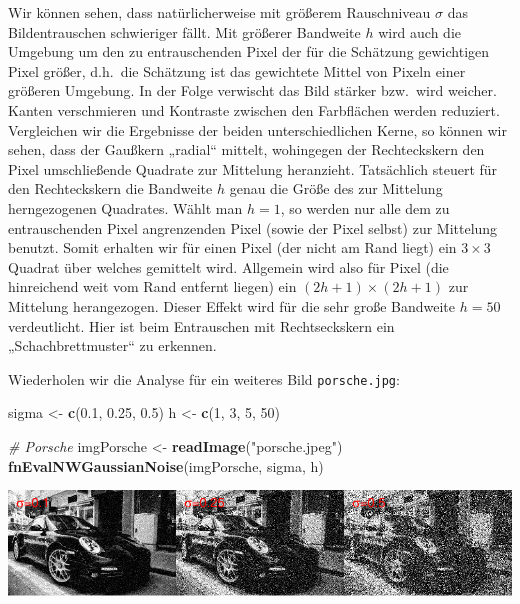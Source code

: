 \documentclass[10pt,]{article}
\newenvironment{Shaded}{\begin{snugshade}}{\end{snugshade}}
\newcommand{\KeywordTok}[1]{\textcolor[rgb]{0.13,0.29,0.53}{\textbf{{#1}}}}
\newcommand{\DecValTok}[1]{\textcolor[rgb]{0.00,0.00,0.81}{{#1}}}
\newcommand{\FloatTok}[1]{\textcolor[rgb]{0.00,0.00,0.81}{{#1}}}
\newcommand{\StringTok}[1]{\textcolor[rgb]{0.31,0.60,0.02}{{#1}}}
\newcommand{\CommentTok}[1]{\textcolor[rgb]{0.56,0.35,0.01}{\textit{{#1}}}}
\newcommand{\NormalTok}[1]{{#1}}
\begin{document}
Wir können sehen, dass natürlicherweise mit größerem Rauschniveau
\(\sigma\) das Bildentrauschen schwieriger fällt. Mit größerer Bandweite
\(h\) wird auch die Umgebung um den zu entrauschenden Pixel der für die
Schätzung gewichtigen Pixel größer, d.h.~die Schätzung ist das
gewichtete Mittel von Pixeln einer größeren Umgebung. In der Folge
verwischt das Bild stärker bzw.~wird weicher. Kanten verschmieren und
Kontraste zwischen den Farbflächen werden reduziert. Vergleichen wir die
Ergebnisse der beiden unterschiedlichen Kerne, so können wir sehen, dass
der Gaußkern „radial`` mittelt, wohingegen der Rechteckskern den Pixel
umschließende Quadrate zur Mittelung heranzieht. Tatsächlich steuert für
den Rechteckskern die Bandweite \(h\) genau die Größe des zur Mittelung
herngezogenen Quadrates. Wählt man \(h=1\), so werden nur alle dem zu
entrauschenden Pixel angrenzenden Pixel (sowie der Pixel selbst) zur
Mittelung benutzt. Somit erhalten wir für einen Pixel (der nicht am Rand
liegt) ein \(3\times3\) Quadrat über welches gemittelt wird. Allgemein
wird also für Pixel (die hinreichend weit vom Rand entfernt liegen) ein
\((2h+1) \times (2h+1)\) zur Mittelung herangezogen. Dieser Effekt wird
für die sehr große Bandweite \(h=50\) verdeutlicht. Hier ist beim
Entrauschen mit Rechtseckskern ein „Schachbrettmuster`` zu erkennen.

Wiederholen wir die Analyse für ein weiteres Bild \texttt{porsche.jpg}:

\begin{Shaded}
\begin{Highlighting}[]
\NormalTok{sigma <-}\StringTok{ }\KeywordTok{c}\NormalTok{(}\FloatTok{0.1}\NormalTok{, }\FloatTok{0.25}\NormalTok{, }\FloatTok{0.5}\NormalTok{)}
\NormalTok{h <-}\StringTok{ }\KeywordTok{c}\NormalTok{(}\DecValTok{1}\NormalTok{, }\DecValTok{3}\NormalTok{, }\DecValTok{5}\NormalTok{, }\DecValTok{50}\NormalTok{)}

\CommentTok{# Porsche}
\NormalTok{imgPorsche <-}\StringTok{ }\KeywordTok{readImage}\NormalTok{(}\StringTok{"porsche.jpeg"}\NormalTok{)}
\KeywordTok{fnEvalNWGaussianNoise}\NormalTok{(imgPorsche, sigma, h)}
\end{Highlighting}
\end{Shaded}

\includegraphics{project2_files/figure-latex/Nadaraya-Watson-estimator Porsche-1.pdf}
\end{document}
